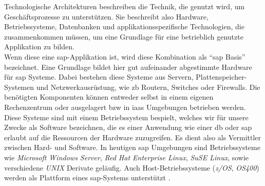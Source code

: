 Technologische Architekturen beschreiben die Technik, die genutzt wird, um Geschäftsprozesse zu unterstützen. Sie beschreibt also Hardware, Betriebssysteme, Datenbanken und applikationsspezifische Technologien, die zusammenkommen müssen, um eine Grundlage für eine betrieblich genutzte Applikation zu bilden.\\
Wenn diese eine \gls{sap}-Applikation ist, wird diese Kombination als "`\gls{sap} Basis"' bezeichnet.
Eine Grundlage bildet hier gut aufeinander abgestimmte Hardware für \gls{sap} Systeme. Dabei bestehen diese Systeme aus Servern, Plattenspeicher-Systemen und Netzwerkausrüstung, wie \gls{zb} Routern, Switches oder Firewalls. Die benötigten Komponenten können entweder selbst in einem eigenen Rechenzentrum oder ausgelagert \gls{bzw} in \gls{iaas} Umgebungen betrieben werden.\\
Diese Systeme sind mit einem Betriebssystem bespielt, welches wir für unsere Zwecke als Software bezeichnen, die es einer Anwendung wie einer \gls{db} oder \gls{sap} erlaubt auf die Ressourcen der Hardware zuzugreifen. Es dient also als Vermittler zwischen Hard- und Software.
In heutigen \gls{sap} Umgebungen sind Betriebssysteme wie \emph{Microsoft Windows Server}, \emph{Red Hat Enterprise Linux}, \emph{SuSE Linux}, sowie verschiedene \emph{UNIX} Derivate geläufig. Auch Host-Betriebssysteme (\emph{z/OS}, \emph{OS400}) werden als Plattform eines \gls{sap}-Systems unterstützt \cite{SAPin24hrs}. 

